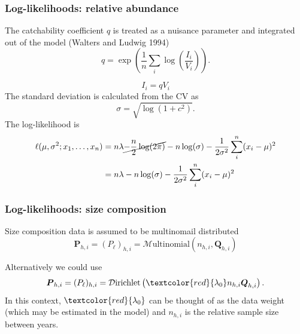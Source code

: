 \documentclass{beamer}
\begin{document}
\begin{frame}
\frametitle{Log-likelihoods: relative abundance}
The catchability coefficient $q$ is treated as a nuisance parameter and
integrated out of the model (Walters and Ludwig 1994)
\begin{equation*}
  q = \exp \left( \frac{1}{n} \sum_i \log \left( \frac{I_i}{V_i} \right) \right).
\end{equation*}

\begin{equation*}
  I_i = q V_i
\end{equation*}
The standard deviation is calculated from the CV as
\begin{equation*}
  \sigma = \sqrt{\log \left( 1+c^2 \right)}.
\end{equation*}
The log-likelihood is
\begin{align*}
  \ell(\mu,\sigma^2; x_1,\ldots,x_n)
  &= n \lambda \cancel{-\frac{n}{2} \log (2 \pi)} - n \log (\sigma) - \frac{1}{2\sigma^2} \sum_i^n (x_i - \mu)^2\\
  &= n \lambda - n \log (\sigma) - \frac{1}{2\sigma^2} \sum_i^n (x_i - \mu)^2\\
\end{align*}
\end{frame}


\begin{frame}
\frametitle{Log-likelihoods: size composition}
Size composition data is assumed to be multinomail distributed
\begin{equation*}
  \boldsymbol{P}_{h,i} = (P_\ell)_{h,i} = \mathcal{M}\text{ultinomial} \left( n_{h,i},
  \boldsymbol{Q}_{h,i} \right)
\end{equation*}

Alternatively we could use
\begin{equation*}
  \boldsymbol{P}_{h,i} = (P_\ell)_{h,i} = \mathcal{D}\text{irichlet} \left(
    \textcolor{red}{\lambda_0} n_{h,i} \boldsymbol{Q}_{h,i} \right).
\end{equation*}
In this context, $\textcolor{red}{\lambda_0}$ can be thought of as the data
weight (which may be estimated in the model) and $n_{h,i}$ is the relative
sample size between years.
\end{frame}

\end{document}
